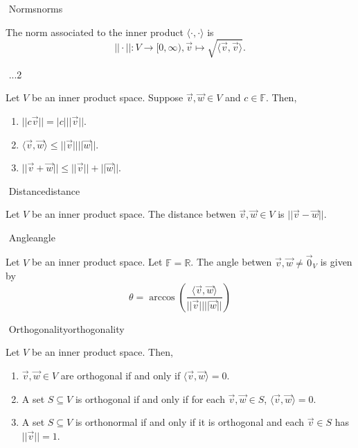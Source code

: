         \begin{definition}{\Stop\,\,Norms}{norms}

            The norm associated to the inner product \(\langle\cdot,\cdot\rangle\) is
            \begin{equation*}
                ||\cdot||:V\to[0,\infty),\vec{v}\mapsto\sqrt{\langle\vec{v},\vec{v}\rangle}.
            \end{equation*}
            
        \end{definition}
        \pagebreak
        \begin{theorem}{\Stop\,\,}{...2}
            
            Let \(V\) be an inner product space. Suppose \(\vec{v},\vec{w}\in V\) and \(c\in\mathbb{F}\). Then,
            \begin{enumerate}
                \item \(||c\vec{v}||=|c|||\vec{v}||\).
                \item \(\langle \vec{v},\vec{w}\rangle\leq ||\vec{v}||||\vec{w}||\).
                \item \(||\vec{v}+\vec{w}||\leq||\vec{v}||+||\vec{w}||\).
            \end{enumerate}

        \end{theorem}
        \begin{definition}{\Stop\,\,Distance}{distance}

            Let \(V\) be an inner product space. The distance betwen \(\vec{v},\vec{w}\in V\) is \(||\vec{v}-\vec{w}||\).
            
        \end{definition}
        \begin{definition}{\Stop\,\,Angle}{angle}

            Let \(V\) be an inner product space. Let \(\mathbb{F}=\mathbb{R}\). The angle betwen \(\vec{v},\vec{w}\neq\vec{0}_V\) is given by
            \begin{equation*}
                \theta =\arccos\left(\frac{\langle\vec{v},\vec{w}\rangle}{||\vec{v}||||\vec{w}||}\right)
            \end{equation*}
            
        \end{definition}
        \begin{definition}{\Stop\,\,Orthogonality}{orthogonality}

            Let \(V\) be an inner product space. Then, 
            \begin{enumerate}
                \item \(\vec{v},\vec{w}\in V\) are orthogonal if and only if \(\langle\vec{v},\vec{w}\rangle=0\).
                \item A set \(S\subseteq V\) is orthogonal if and only if for each \(\vec{v},\vec{w}\in S\), \(\langle\vec{v},\vec{w}\rangle=0\).
                \item A set \(S\subseteq V\) is orthonormal if and only if it is orthogonal and each \(\vec{v}\in S\) has \(||\vec{v}||=1\).
            \end{enumerate}

        \end{definition}

